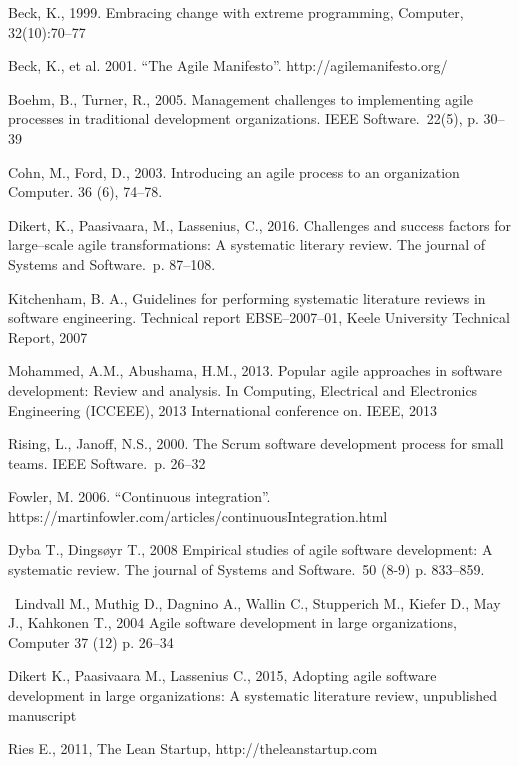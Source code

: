\noindent [1] Beck, K., 1999. Embracing change with extreme programming, Computer,
32(10):70–77

\noindent [2] Beck, K., et al. 2001. ``The Agile Manifesto''.
http://agilemanifesto.org/

\noindent [3] Boehm, B., Turner, R., 2005. Management challenges to implementing agile
processes in traditional development organizations. IEEE Software.\ 22(5), p. 30–39

\noindent [4] Cohn, M., Ford, D., 2003. Introducing an agile process to an
organization Computer. 36 (6), 74–78.

\noindent [5] Dikert, K., Paasivaara, M., Lassenius, C., 2016. Challenges and success factors
for large–scale agile transformations: A systematic literary review. The journal
of Systems and Software.\ p. 87–108.

\noindent [6] Kitchenham, B. A., Guidelines for performing systematic literature
reviews in software engineering. Technical report EBSE–2007–01, Keele University
Technical Report, 2007

\noindent [7] Mohammed, A.M., Abushama, H.M., 2013. Popular agile approaches in software
development: Review and analysis. In Computing, Electrical and Electronics
Engineering (ICCEEE), 2013 International conference on. IEEE, 2013

\noindent [8] Rising, L., Janoff, N.S., 2000. The Scrum software development process for small teams. IEEE Software.\ p. 26–32

\noindent [9] Fowler, M. 2006. ``Continuous integration''.
https://martinfowler.com/articles/continuousIntegration.html

\noindent [10] Dyba T., Dingsøyr T., 2008 Empirical studies of agile
software development: A systematic review. The journal of Systems and
Software.\ 50 (8-9) p. 833–859.

\noindent [11] Lindvall M., Muthig D., Dagnino A., Wallin C.,
Stupperich M., Kiefer D., May J., Kahkonen T., 2004
Agile software development in large organizations, Computer 37 (12) p. 26–34

\noindent [12] Dikert K., Paasivaara M., Lassenius C., 2015, Adopting agile software development in large organizations: A systematic literature review, unpublished manuscript

\noindent [13] Ries E., 2011, The Lean Startup, http://theleanstartup.com
